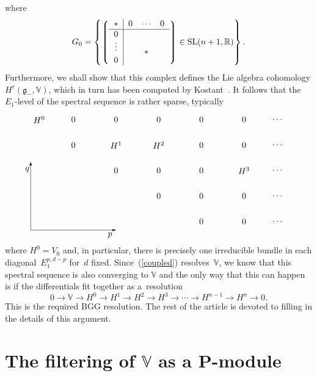 \documentclass[11pt]{article}
\begin{document}
\noindent
where
\[G_0=\left\{
\left\lgroup\begin{tabular}{c|ccc}$\ast$&$0$&$\!\cdots\!$&$0$\\ \hline
$0$\\
\raisebox{2pt}[15pt]{$\vdots$}&&
\raisebox{-2pt}[0pt][0pt]{\makebox[0pt]{\Huge$\ast$}}\\
$0$\end{tabular}\right\rgroup\in{\mathrm{SL}}(n+1,{\mathbb{R}})\right\}.\]
Furthermore, we shall show that this complex def\/ines the Lie algebra
cohomology $H^r({\mathfrak{g}}_-,{\mathbb{V}})$, which in turn has been
computed by Kostant~\cite{k}. It follows that the $E_1$-level of the spectral
sequence is rather sparse, typically
\begin{equation}\label{sparse}\raisebox{-70pt}{\begin{picture}(300,148)(0,10)
\put(0,20){\vector(1,0){100}}
\put(0,20){\vector(0,1){80}}
\put(93,14){\makebox(0,0){$p$}}
\put(-4,91){\makebox(0,0){$q$}}
\put(10,150){\makebox(0,0){$H^0$}}
\put(50,150){\makebox(0,0){$0$}}
\put(100,150){\makebox(0,0){$0$}}
\put(150,150){\makebox(0,0){$0$}}
\put(200,150){\makebox(0,0){$0$}}
\put(250,150){\makebox(0,0){$0$}}
\put(290,150){\makebox(0,0){$\cdots$}}
\put(290,120){\makebox(0,0){$\cdots$}}
\put(290,90){\makebox(0,0){$\cdots$}}
\put(290,60){\makebox(0,0){$\cdots$}}
\put(290,30){\makebox(0,0){$\cdots$}}
\put(50,120){\makebox(0,0){$0$}}
\put(100,120){\makebox(0,0){$H^1$}}
\put(150,120){\makebox(0,0){$H^2$}}
\put(200,120){\makebox(0,0){$0$}}
\put(250,120){\makebox(0,0){$0$}}
\put(100,90){\makebox(0,0){$0$}}
\put(150,90){\makebox(0,0){$0$}}
\put(200,90){\makebox(0,0){$0$}}
\put(250,90){\makebox(0,0){$H^3$}}
\put(150,60){\makebox(0,0){$0$}}
\put(200,60){\makebox(0,0){$0$}}
\put(250,60){\makebox(0,0){$0$}}
\put(200,30){\makebox(0,0){$0$}}
\put(250,30){\makebox(0,0){$0$}}
\end{picture}}\end{equation}
where $H^0=V_0$ and, in particular, there is precisely one irreducible bundle
in each diagonal~$E_1^{p,d-p}$ for~$d$ f\/ixed. Since~(\ref{coupled})
resolves~${\mathbb{V}}$, we know that this spectral sequence is also converging
to ${\mathbb{V}}$ and the only way that this can happen is if the dif\/ferentials
f\/it together as a~resolution
\[0\to{\mathbb{V}}
\to H^0\to H^1\to H^2\to H^3\to\cdots\to H^{n-1}\to H^n\to 0.\]
This is the required BGG resolution. The rest of the article is devoted to
f\/illing in the details of this argument.

\section[The filtering of ${\mathbb{V}}$ as a $P$-module]{The f\/iltering of $\boldsymbol{{\mathbb{V}}}$ as a $\boldsymbol{P}$-module}\label{filtering}
\end{document}
